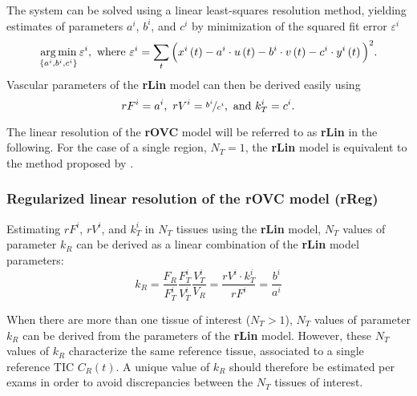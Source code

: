The system can be solved using a linear least-squares resolution method, yielding estimates of parameters $a^i$, $b^i$, and $c^i$ by minimization of the squared fit error $\varepsilon^i$
\begin{equation}
\operatorname*{arg\,min}_{\left\lbrace a^i, b^i, c^i\right\rbrace} \varepsilon^i, \textrm{ where } \varepsilon^i = \sum_t \Big( x^i\left(t\right) - a^i\cdot u\left(t\right) - b^i\cdot v\left(t\right) - c^i\cdot y^i\left(t\right) \Big)^2.
\end{equation}
Vascular parameters of the \textbf{rLin} model can then be derived easily using
\begin{equation}
rF^i = a^i,~rV^i = \nicefrac{b^i}{c^i}, \textrm{ and } k_T^i = c^i.
\end{equation}

The linear resolution of the \textbf{rOVC} model will be referred to as \textbf{rLin} in the following.
For the case of a single region, $N_T = 1$, the \textbf{rLin} model is equivalent to the method proposed by \citet{CardenasRodriguez:2013em}.

\subsubsection{Regularized linear resolution of the rOVC model (rReg)}
Estimating $rF^i$, $rV^i$, and $k_T^i$ in $N_T$ tissues using the \textbf{rLin} model, $N_T$ values of parameter $k_R$ can be derived as a linear combination of the \textbf{rLin} model parameters:
\begin{equation}
k_R = \frac{F_R}{F_T^i}\frac{F_T^i}{V_T^i}\frac{V_T^i}{V_R} = \frac{rV^i \cdot k_T^i}{rF^i} = \frac{b^i}{a^i}
\label{eq:KR}
\end{equation}

When there are more than one tissue of interest ($N_T > 1$), $N_T$ values of parameter $k_R$ can be derived from the parameters of the \textbf{rLin} model. 
However, these $N_T$ values of $k_R$ characterize the same reference tissue, associated to a single reference TIC $C_R\left(t\right)$. 
A unique value of $k_R$ should therefore be estimated per exams in order to avoid discrepancies between the $N_T$ tissues of interest.

